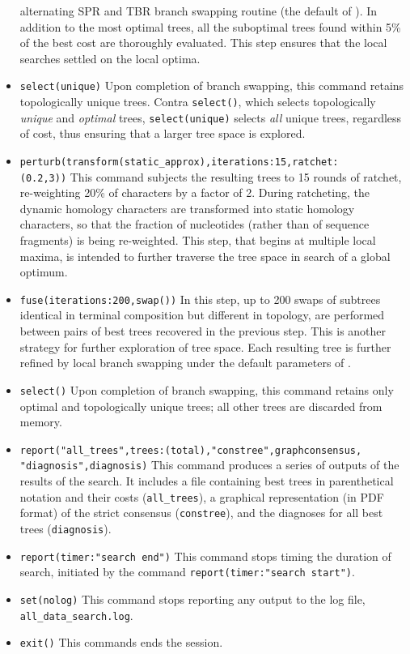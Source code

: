 \begin{itemize}
alternating SPR and TBR branch swapping routine (the default of \poy). In addition to the most optimal trees, 
all the suboptimal trees found within 5\% of the best cost are thoroughly evaluated. This step ensures that 
the local searches settled on the local optima.
\item \texttt{select(unique)} Upon completion of branch swapping, this command retains topologically unique trees.
Contra \texttt{select()}, which selects topologically \emph{unique} and \emph{optimal} trees,  \texttt{select(unique)} 
selects \emph{all} unique trees, regardless of cost, thus ensuring that a larger tree space is explored.
\item \texttt{perturb(transform(static\_approx),iterations:15,ratchet:\\(0.2,3))} This command subjects the 
resulting trees to 15 rounds of ratchet, re-weighting 20\% of characters by a factor of 2. During ratcheting, 
the dynamic homology characters are transformed into static homology characters, so that the fraction of 
nucleotides (rather than of sequence fragments) is being re-weighted. This step, that begins at multiple 
local maxima, is intended to further traverse the tree space in search of a global optimum.
\item \texttt{fuse(iterations:200,swap())} In this step, up to 200 swaps of subtrees identical in terminal 
composition but different in topology, are performed between pairs of best trees recovered in the previous 
step. This is another strategy for further exploration of tree space. Each resulting tree is further refined by 
local branch swapping under the default parameters of .
\item \texttt{select()} Upon completion of branch swapping, this command retains only optimal and 
topologically unique trees; all other trees are discarded from memory.
\item \texttt{report("all\_trees",trees:(total),"constree",graphconsensus,\\"diagnosis",diagnosis)} This command 
produces a series of outputs of the results of the search. It includes a file containing best trees in parenthetical 
notation and their costs (\texttt{all\_trees}), a graphical representation (in PDF format) of the strict consensus 
(\texttt{constree}), and the diagnoses for all best trees (\texttt{diagnosis}).
\item \texttt{report(timer:"search end")} This command stops timing the duration of search, initiated by the 
command \texttt{report(timer:"search start")}.
\item \texttt{set(nolog)} This command stops reporting any output to the log file, \texttt{all\_data\_search.log}.
\item \texttt{exit()} This commands ends the \poy session.
\end{itemize}

